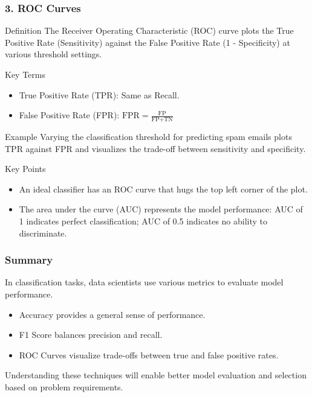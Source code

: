 \documentclass[aspectratio=169]{beamer}
\begin{document}
\begin{frame}[fragile]
    \frametitle{3. ROC Curves}
    \begin{block}{Definition}
        The Receiver Operating Characteristic (ROC) curve plots the True Positive Rate (Sensitivity) against the False Positive Rate (1 - Specificity) at various threshold settings.
    \end{block}
    
    \begin{block}{Key Terms}
        \begin{itemize}
            \item True Positive Rate (TPR): Same as Recall.
            \item False Positive Rate (FPR): \(\text{FPR} = \frac{\text{FP}}{\text{FP} + \text{TN}}\)
        \end{itemize}
    \end{block}
    
    \begin{block}{Example}
        Varying the classification threshold for predicting spam emails plots TPR against FPR and visualizes the trade-off between sensitivity and specificity.
    \end{block}
    
    \begin{block}{Key Points}
        \begin{itemize}
            \item An ideal classifier has an ROC curve that hugs the top left corner of the plot.
            \item The area under the curve (AUC) represents the model performance: AUC of 1 indicates perfect classification; AUC of 0.5 indicates no ability to discriminate.
        \end{itemize}
    \end{block}
\end{frame}

\begin{frame}[fragile]
    \frametitle{Summary}
    In classification tasks, data scientists use various metrics to evaluate model performance. 
    \begin{itemize}
        \item Accuracy provides a general sense of performance.
        \item F1 Score balances precision and recall.
        \item ROC Curves visualize trade-offs between true and false positive rates.
    \end{itemize}
    Understanding these techniques will enable better model evaluation and selection based on problem requirements.
\end{frame}
\end{document}
